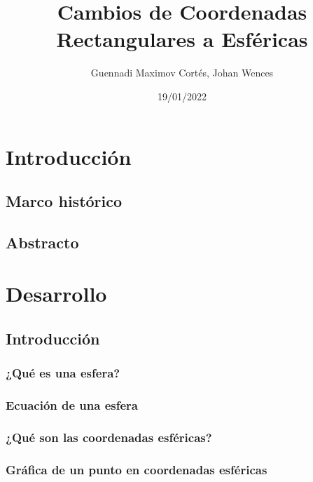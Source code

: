 \documentclass[letterpaper,14pt]{extreport} %
\title{Cambios de Coordenadas Rectangulares a Esféricas} %
\author{Guennadi Maximov Cortés, Johan Wences} %
\date{19/01/2022} %
\begin{document}
  \maketitle
  \tableofcontents
  \newpage

  \chapter{Introducción}
      
    \section{Marco histórico}
      

    \section{Abstracto}
      

  \chapter{Desarrollo}
    \renewcommand{\chaptername}{Jornada}
    

    \section{Introducción}
      \subsection{¿Qué es una esfera?}
          

      \subsection{Ecuación de una esfera}
          

      \subsection{¿Qué son las coordenadas esféricas?}
          

      \subsection{Gráfica de un punto en coordenadas esféricas}
          
\end{document}
